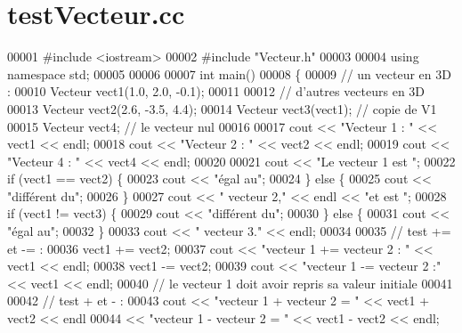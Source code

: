 \section{test\+Vecteur.\+cc}
\label{test_vecteur_8cc_source}

\begin{DoxyCode}
00001 \textcolor{preprocessor}{#include <iostream>}
00002 \textcolor{preprocessor}{#include "Vecteur.h"}
00003 
00004 \textcolor{keyword}{using namespace }std;
00005 
00006 
00007 \textcolor{keywordtype}{int} main()
00008 \{
00009     \textcolor{comment}{// un vecteur en 3D :}
00010     Vecteur vect1(1.0, 2.0, -0.1);
00011 
00012     \textcolor{comment}{// d'autres vecteurs en 3D}
00013     Vecteur vect2(2.6, -3.5, 4.4);
00014     Vecteur vect3(vect1);  \textcolor{comment}{// copie de V1}
00015     Vecteur vect4;         \textcolor{comment}{// le vecteur nul}
00016 
00017     cout << \textcolor{stringliteral}{"Vecteur 1 : "} << vect1 << endl;
00018     cout << \textcolor{stringliteral}{"Vecteur 2 : "} << vect2 << endl;
00019     cout << \textcolor{stringliteral}{"Vecteur 4 : "} << vect4 << endl;
00020 
00021     cout << \textcolor{stringliteral}{"Le vecteur 1 est "};
00022     \textcolor{keywordflow}{if} (vect1 == vect2) \{
00023         cout << \textcolor{stringliteral}{"égal au"};
00024     \} \textcolor{keywordflow}{else} \{
00025         cout << \textcolor{stringliteral}{"différent du"};
00026     \}
00027     cout << \textcolor{stringliteral}{" vecteur 2,"} << endl << \textcolor{stringliteral}{"et est "};
00028     \textcolor{keywordflow}{if} (vect1 != vect3) \{
00029         cout << \textcolor{stringliteral}{"différent du"};
00030     \} \textcolor{keywordflow}{else} \{
00031         cout << \textcolor{stringliteral}{"égal au"};
00032     \}
00033     cout << \textcolor{stringliteral}{" vecteur 3."} << endl;
00034     
00035     \textcolor{comment}{// test += et -= :}
00036     vect1 += vect2;
00037     cout << \textcolor{stringliteral}{"vecteur 1 += vecteur 2 : "} << vect1 << endl;
00038     vect1 -= vect2;
00039     cout << \textcolor{stringliteral}{"vecteur 1 -= vecteur 2 :"} << vect1 << endl;
00040     \textcolor{comment}{// le vecteur 1 doit avoir repris sa valeur initiale}
00041     
00042     \textcolor{comment}{// test + et - :}
00043     cout << \textcolor{stringliteral}{"vecteur 1 + vecteur 2 = "} << vect1 + vect2 << endl
00044          << \textcolor{stringliteral}{"vecteur 1 - vecteur 2 = "} << vect1 - vect2 << endl;

\end{DoxyCode}
